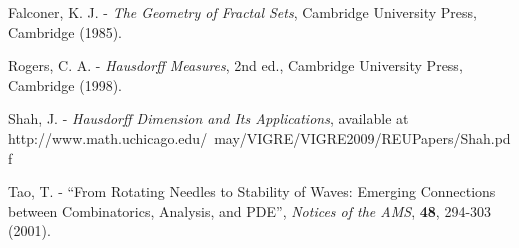 \documentclass[11pt, reqno]{amsart}
\begin{document}
\begin{thebibliography}{1}
Falconer, K. J. - \textit{The Geometry of Fractal Sets}, Cambridge University Press, Cambridge (1985).

Rogers, C. A. - \textit{Hausdorff Measures}, 2nd ed., Cambridge University Press, Cambridge (1998).

Shah, J. - \textit{Hausdorff Dimension and Its Applications}, available at http://www.math.uchicago.edu/~may/VIGRE/VIGRE2009/REUPapers/Shah.pdf

Tao, T. - ``From Rotating Needles to Stability of Waves: Emerging Connections between Combinatorics, Analysis, and PDE'', \textit{Notices of the AMS}, \textbf{48}, 294-303 (2001).

\end{thebibliography}
\end{document}
